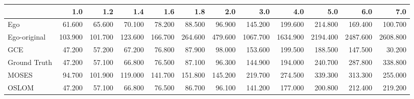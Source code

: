\begin{tabular}{lrrrrrrrrrrr}
\toprule
{} &     1.0 &     1.2 &     1.4 &     1.6 &     1.8 &     2.0 &      3.0 &      4.0 &      5.0 &      6.0 &      7.0 \\
\midrule
Ego          &  61.600 &  65.600 &  70.100 &  78.200 &  88.500 &  96.900 &  145.200 &  199.600 &  214.800 &  169.400 &  100.700 \\
Ego-original & 103.900 & 101.700 & 123.600 & 166.700 & 264.600 & 479.600 & 1067.700 & 1634.900 & 2194.400 & 2487.600 & 2608.800 \\
GCE          &  47.200 &  57.200 &  67.200 &  76.800 &  87.900 &  98.000 &  153.600 &  199.500 &  188.500 &  147.500 &   30.200 \\
Ground Truth &  47.200 &  57.100 &  66.800 &  76.500 &  87.100 &  96.300 &  144.900 &  194.000 &  240.700 &  287.800 &  338.800 \\
MOSES        &  94.700 & 101.900 & 119.000 & 141.700 & 151.800 & 145.200 &  219.700 &  274.500 &  339.300 &  313.300 &  255.000 \\
OSLOM        &  47.200 &  57.100 &  66.800 &  76.500 &  86.700 &  96.100 &  141.200 &  177.000 &  200.800 &  212.400 &  219.200 \\
\bottomrule
\end{tabular}
